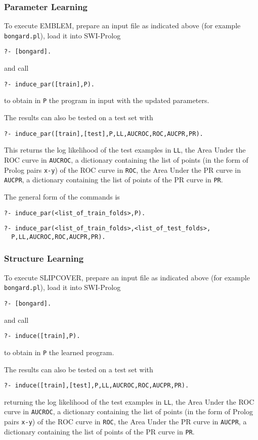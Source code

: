 \documentclass[a4paper,10pt]{article}
\begin{document}
\subsubsection{Parameter Learning}
To execute EMBLEM, prepare an input file as indicated above 
(for example \verb|bongard.pl|), load it into SWI-Prolog
\begin{verbatim}
?- [bongard].
\end{verbatim}
and call
\begin{verbatim}
?- induce_par([train],P).
\end{verbatim}
to obtain in \verb|P| the program in input with the updated parameters.

The results can also be tested on a test set with
\begin{verbatim}
?- induce_par([train],[test],P,LL,AUCROC,ROC,AUCPR,PR).
\end{verbatim}
This returns the log likelihood of the test examples in \verb|LL|, the Area Under the ROC curve in \verb|AUCROC|, a dictionary containing the list of points (in the form of Prolog pairs \verb|x-y|) of the ROC curve in \verb|ROC|,
the Area Under the PR curve in \verb|AUCPR|, a dictionary containing the list of points of the PR curve in \verb|PR|.

The general form of the commands is
\begin{verbatim}
?- induce_par(<list_of_train_folds>,P).
\end{verbatim}
\begin{verbatim}
?- induce_par(<list_of_train_folds>,<list_of_test_folds>,
  P,LL,AUCROC,ROC,AUCPR,PR).
\end{verbatim}

\subsubsection{Structure Learning}
To execute SLIPCOVER,
prepare an input file as indicated above 
(for example \verb|bongard.pl|), load it into SWI-Prolog
\begin{verbatim}
?- [bongard].
\end{verbatim}
and call
\begin{verbatim}
?- induce([train],P).
\end{verbatim}
to obtain in \verb|P| the learned program.

The results can also be tested on a test set with
\begin{verbatim}
?- induce([train],[test],P,LL,AUCROC,ROC,AUCPR,PR).
\end{verbatim}
returning the log likelihood of the test examples in \verb|LL|, the Area Under the ROC curve in \verb|AUCROC|, a dictionary containing the list of points (in the form of Prolog pairs \verb|x-y|) of the ROC curve in \verb|ROC|,
the Area Under the PR curve in \verb|AUCPR|, a dictionary containing the list of points of the PR curve in \verb|PR|.
\end{document}
